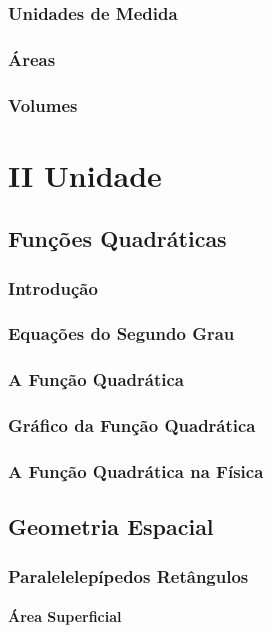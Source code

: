 \documentclass[12pt,a4paper]{book}
\begin{document}
	\section{Unidades de Medida}
	\section{Áreas}
	\section{Volumes}		
		
\part*{II Unidade}
	\chapter{Funções Quadráticas}
	
		\section{Introdução}
		\section{Equações do Segundo Grau}
		\section{A Função Quadrática}
		\section{Gráfico da Função Quadrática}
		\section{A Função Quadrática na Física}

	\chapter{Geometria Espacial}
		
		\section{Paralelelepípedos Retângulos}
			\subsection{Área Superficial}
\end{document}
